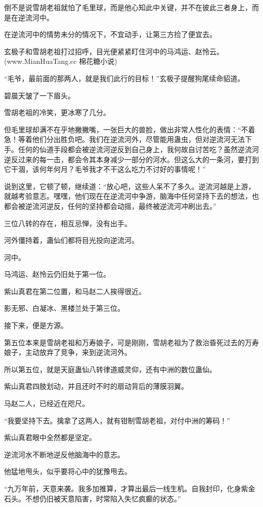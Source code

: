 \begin{this_body}
倒不是说雪胡老祖就怕了毛里球，而是他心知此中关键，并不在彼此三者身上，而是在逆流河中。

在逆流河中的情势未分的情况下，不宜动手，让第三方捡了便宜去。

玄极子和雪胡老祖打过招呼，目光便紧紧盯住河中的马鸿运、赵怜云。(www.MianHuaTang.cc 棉花糖小说)

“毛爷，最前面的那两人，就是我们此行的目标！”玄极子提醒狗尾续命貂道。

碧晨天皱了一下眉头。

雪胡老祖的冷笑，更冰寒了几分。

但毛里球却满不在乎地撇撇嘴，一张巨大的兽脸，做出非常人性化的表情：“不着急！等着他们分出胜负吧。我们在逆流河外，尽管能用蛊虫，但对逆流河无法下手。任何的仙道手段都会被逆流河逆反到自己身上，我何故自讨苦吃？虽然逆流河逆反过来的每一击，都会令其本身减少一部分的河水。但这么大的一条河，要打到它干涸，该何年何月？毛爷我才不干这么吃力不讨好的事情呢！”

说到这里，它顿了顿，继续道：“放心吧，这些人呆不了多久。逆流河越是上游，就越考验意志。嘿嘿，他们现在在逆流河中争游，脑海中任何坚持下去的想法，也都会被逆流河逆反，任何的坚持都会动摇，最终被逆流河冲刷出去。”

三位八转的存在，相互忌惮，没有出手。

河外僵持着，蛊仙们都将目光投向逆流河。

河中。

马鸿运、赵怜云仍旧处于第一位。

紫山真君在第二位置，和马赵二人挨得很近。

影无邪、白凝冰、黑楼兰处于第三位。

接下来，便是方源。

第五位本来是雪胡老祖和万寿娘子，可是刚刚，雪胡老祖为了救治昏死过去的万寿娘子，主动放弃了竞争，来到逆流河外。

所以第五位，就是天庭蛊仙八转律道威灵仰，还有中洲的数位蛊仙。

紫山真君四肢划动，并且还时不时的扇动背后的薄膜羽翼。

马赵二人，已经近在咫尺。

“我要坚持下去。擒拿了这两人，就有钳制雪胡老祖，对付中洲的筹码！”

紫山真君眼中全然都是坚定。

逆流河水不断地逆反他脑海中的意志。

他猛地甩头，似乎要将心中的犹豫甩去。

“九万年前，天意来袭。我多加推算，才算出最后一线生机。自我封印，化身紫金石头。不想仍旧被天意陷害，时常陷入失忆疯癫的状态。”


\end{this_body}
